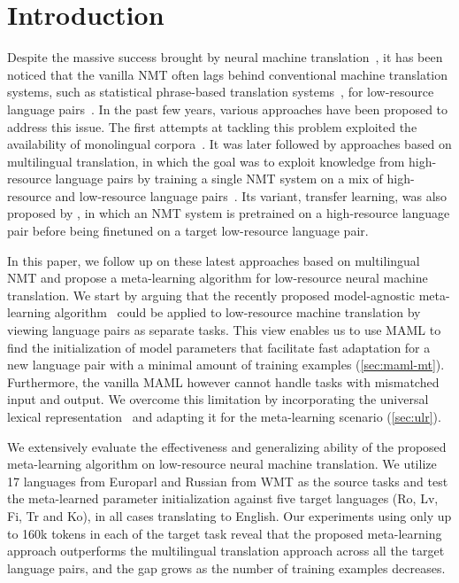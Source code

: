 
\section{Introduction}

Despite the massive success brought by neural machine translation~\citep[NMT,][]{sutskever2014sequence,bahdanau2014neural,vaswani2017attention}, it has been noticed that the vanilla NMT often lags behind conventional machine translation systems, such as statistical phrase-based translation systems~\citep[PBMT,][]{koehn2003statistical}, for low-resource language pairs~\citep[see, e.g.,][]{koehn2017six}. In the past few years, various approaches have been proposed to address this issue. The first attempts at tackling this problem exploited the availability of monolingual corpora~\citep{Gulcehre-Orhan-et-al-2015,sennrich2015improving,zhang2016exploiting}. It was later followed by approaches based on multilingual translation, in which the goal was to exploit knowledge from high-resource language pairs by training a single NMT system on a mix of high-resource and low-resource language pairs~\citep{firat2016multi,firat2016zero,lee2016fully,johnson2016google,ha2016toward}. Its variant, transfer learning, was also proposed by \citet{zoph2016transfer}, in which an NMT system is pretrained on a high-resource language pair before being finetuned on a target low-resource language pair.

In this paper, we follow up on these latest approaches based on multilingual NMT and propose a meta-learning algorithm for low-resource neural machine translation. We start by arguing that the recently proposed model-agnostic meta-learning algorithm~\citep[MAML,][]{finn2017model} could be applied to low-resource machine translation by viewing language pairs as separate tasks. This view enables us to use MAML to find the initialization of model parameters that facilitate fast adaptation for a new language pair with a minimal amount of training examples (\textsection\ref{sec:maml-mt}). Furthermore, the vanilla MAML however cannot handle tasks with mismatched input and output. We overcome this limitation by incorporating the universal lexical representation~\citep{gu2018universal} and adapting it for the meta-learning scenario (\textsection\ref{sec:ulr}).

We extensively evaluate the effectiveness and generalizing ability of the proposed meta-learning algorithm on low-resource neural machine translation. We utilize 17 languages from Europarl and Russian from WMT as the source tasks and test the meta-learned parameter initialization against five target languages (Ro, Lv, Fi, Tr and Ko), in all cases translating to English. Our experiments using only up to 160k tokens in each of the target task reveal that the proposed meta-learning approach outperforms the multilingual translation approach across all the target language pairs, and the gap grows as the number of training examples decreases.



